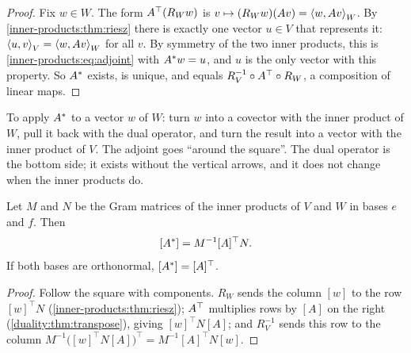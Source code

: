 \begin{notechapter}
\begin{proof}
Fix $w\in W$. The form $A^{\top}(R_Ww)$ is
$v\mapsto(R_Ww)(Av) = \left\langle w, Av \right\rangle_W$. By \cref{inner-products:thm:riesz}
there is exactly one vector $u\in V$ that represents it:
$\left\langle u, v \right\rangle_V = \left\langle w, Av \right\rangle_W$ for all $v$. By symmetry of the two inner
products, this is \eqref{inner-products:eq:adjoint} with $A^{*}w = u$, and
$u$ is the only vector with this property. So $A^{*}$ exists, is unique,
and equals $R_V^{-1}\circ A^{\top}\circ R_W$, a composition of linear maps.
\end{proof}

\begin{center}
\end{center}

\begin{intuition}
To apply $A^{*}$ to a vector $w$ of $W$: turn $w$ into a covector with the
inner product of $W$, pull it back with the dual operator, and turn the
result into a vector with the inner product of $V$. The adjoint goes
``around the square''. The dual operator is the bottom side; it exists
without the vertical arrows, and it does not change when the inner
products do.
\end{intuition}

\begin{theorem}\label{inner-products:thm:matrix}
Let $M$ and $N$ be the Gram matrices of the inner products of $V$ and $W$
in bases $e$ and $f$. Then
\[
  [A^{*}] = M^{-1}[A]^\top N .
\]
If both bases are orthonormal, $[A^{*}] = [A]^\top$.
\end{theorem}

\begin{proof}
Follow the square with components. $R_W$ sends the column $[w]$ to the row
$[w]^\top N$ (\cref{inner-products:thm:riesz}); $A^{\top}$ multiplies rows by
$[A]$ on the right (\cref{duality:thm:transpose}), giving
$[w]^\top N[A]$; and $R_V^{-1}$ sends this row to the column
$M^{-1}\bigl([w]^\top N[A]\bigr)^\top = M^{-1}[A]^\top N[w]$.
\end{proof}


\end{notechapter}
